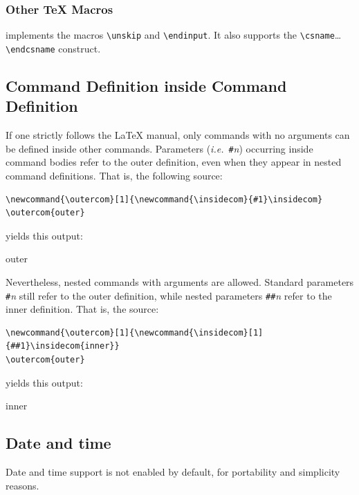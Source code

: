 \subsubsection{Other \TeX{} Macros}
\hevea{} implements the macros \verb+\unskip+ and \verb+\endinput+.
It also supports the \verb+\csname+\ldots{} \verb+\endcsname+
construct.


\subsection{Command Definition inside Command Definition}
If one strictly follows the \LaTeX{} manual, only commands with no
arguments can be defined inside other commands.
Parameters (\emph{i.e.}\ \verb+#+\textit{n}) occurring inside command bodies
refer to the outer definition, even when they appear in nested
command definitions.
That is, the following source:
\begin{verbatim}
\newcommand{\outercom}[1]{\newcommand{\insidecom}{#1}\insidecom}
\outercom{outer}
\end{verbatim}
yields this output:
\begin{center}
\newcommand{\outercom}[1]{\newcommand{\insidecom}{#1}\insidecom}
\outercom{outer}
\end{center}

Nevertheless, nested commands with arguments are allowed.
Standard parameters \verb+#+\textit{n} still refer to the outer
definition, while nested parameters \verb+##+\textit{n} refer to the
inner definition.
That is, the source:
\begin{verbatim}
\newcommand{\outercom}[1]{\newcommand{\insidecom}[1]{##1}\insidecom{inner}}
\outercom{outer}
\end{verbatim}
yields this output:
\begin{center}
\newcommand{\outercom}[1]{\newcommand{\insidecom}[1]{##1}\insidecom{inner}}
\outercom{outer}
\end{center}

\subsection{Date and time}
Date and time support is not enabled by default, for portability and
simplicity reasons.

